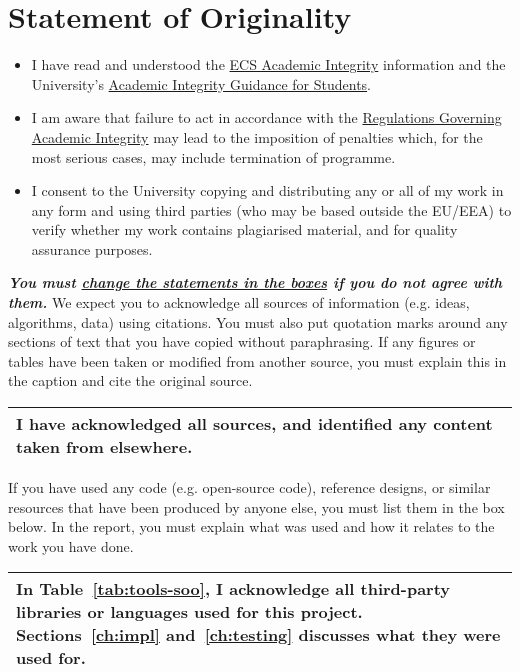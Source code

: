 \section*{Statement of Originality}

\begin{itemize}
  \item I have read and understood the \href{}{ECS Academic Integrity}
        information and the University's \href{}{Academic Integrity
        Guidance for Students}.
  \item I am aware that failure to act in accordance with the \href{}
        {Regulations Governing Academic Integrity} may lead to the
        imposition of penalties which, for the most serious cases, may 
        include termination of programme.
  \item I consent to the University copying and distributing any or all 
        of my work in any form and using third parties (who may be based 
        outside the EU/EEA) to verify whether my work contains plagiarised 
        material, and for quality assurance purposes.
\end{itemize}
\vspace{2mm}
\noindent\textbf{\textit{You must \underline{change the statements in the boxes} if 
you do not agree with them.}}
\x
\noindent We expect you to acknowledge all sources of information (e.g. ideas, algorithms, data) using
citations. You must also put quotation marks around any sections of text that you have copied
without paraphrasing. If any figures or tables have been taken or modified from another source,
you must explain this in the caption and cite the original source.

\begin{longtable}[ht]{ | p{\textwidth} | }
  \hline
  \textbf{ I have acknowledged all sources, and identified any content taken from elsewhere.}
  \\\hline
\end{longtable}

\noindent If you have used any code (e.g. open-source code), reference designs, or similar resources that
have been produced by anyone else, you must list them in the box below. In the report, you must
explain what was used and how it relates to the work you have done.

\begin{longtable}[ht]{ | p{\textwidth} | }
  \hline
  \textbf{In Table~\ref{tab:tools-soo}, I acknowledge all third-party libraries or languages used for this project. Sections~\ref{ch:impl} and~\ref{ch:testing} discusses what they were used for.}
  \\\hline
\end{longtable}

